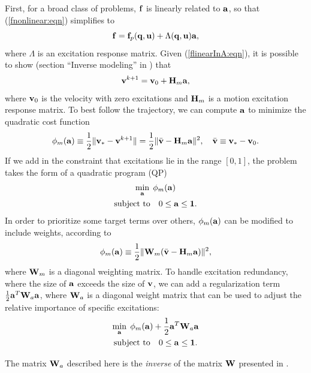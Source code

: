 First, for a broad class of problems, ${\bf f}$ is linearly related to ${\bf a}$,
so that (\ref{fnonlinear:eqn}) simplifies to
%
\begin{equation}
{\bf f} = {\bf f}_p ({\bf q}, {\bf u}) + \Lambda ({\bf q}, {\bf u}) {\bf a},
\label{flinearInA:eqn}	
\end{equation}
where $\Lambda$ is an excitation response matrix. Given (\ref{flinearInA:eqn}),
it is possible to show (section ``Inverse modeling''
in \cite{lloyd2012artisynth}) that
%
\begin{equation*}
{\bf v}^{k+1} = {\bf v}_0 + {\bf H}_m {\bf a},
\end{equation*}
%
where ${\bf v}_0$ is the velocity with zero excitations and ${\bf H}_m$ is a
motion excitation response matrix. To best follow the trajectory, we
can compute ${\bf a}$ to minimize the quadratic cost function
%
\begin{equation}
\phi_m({\bf a}) \equiv \frac{1}{2} \| {\bf v}_* - {\bf v}^{k+1} \| = 
\frac{1}{2} \| \bar{{\bf v}} - {\bf H}_m {\bf a} \|^2, \quad
\bar{{\bf v}} \equiv {\bf v}_* - {\bf v}_0.
\label{MotionCostTerm:eqn}
\end{equation}
%
If we add in the constraint that excitations lie in the range $[0,
1]$, the problem takes the form of a quadratic program (QP)
%
\begin{gather}
\min_{{\bf a}} \; \phi_m({\bf a}) \notag \\
\text{subject to} \quad 0 \le {\bf a} \le {\bf 1}.
\label{basicQP:eqn}
\end{gather}
%
In order to prioritize some target terms over others,
$\phi_m({\bf a})$ can be modified to include weights, according to
%
\begin{equation}
\phi_m({\bf a}) \equiv \frac{1}{2} \| {\bf W}_m (\bar{{\bf v}} - {\bf H}_m {\bf a}) \|^2,
\label{motionCostTerm:eqn}	
\end{equation}
%
where ${\bf W}_m$ is a diagonal weighting matrix.
%
To handle excitation redundancy, where the size of ${\bf a}$ exceeds the
size of ${\bf v}$, we can add a regularization term
$\frac{1}{2} {\bf a}^T {\bf W}_a {\bf a}$, where ${\bf W}_a$ is a diagonal weight matrix that
can be used to adjust the relative importance of specific excitations:
%
\begin{gather}
\min_{{\bf a}} \; \phi_m({\bf a}) + \frac{1}{2} {\bf a}^T {\bf W}_a {\bf a} \notag \notag \\
\text{subject to} \quad 0 \le {\bf a} \le {\bf 1}.
\label{regularizedQP:eqn}
\end{gather}
%

\begin{sideblock}
The matrix ${\bf W}_a$ described here is the {\it inverse} of the matrix ${\bf W}$
presented in \cite{lloyd2012artisynth}.
\end{sideblock}

